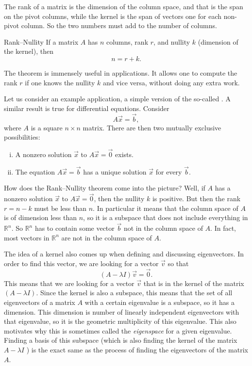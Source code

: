 The rank of a matrix is the dimension of the column space, and that is
the span on the pivot columns, while the kernel is the span of vectors
one for each non-pivot column.  So the two numbers must add to the number of
columns.

\begin{theorem1}{Rank--Nullity}
If a matrix $A$ has $n$ columns, rank $r$, and nullity $k$ (dimension of the
kernel), then
\begin{equation*}
n = r+k .
\end{equation*}
\end{theorem1}

The theorem is immensely useful in applications.  It allows one to compute
the rank $r$ if one knows the nullity $k$ and vice versa, without doing any
extra work.

Let us consider an example application, a simple version of the so-called
\emph{}.  A similar result is true for
differential equations.  Consider
\begin{equation*}
A \vec{x} = \vec{b} ,
\end{equation*}
where $A$ is a square $n \times n$ matrix.
There are then two mutually exclusive possibilities:
\begin{enumerate}[(i)]
\item
A nonzero solution $\vec{x}$ to $A \vec{x} = \vec{0}$ exists.
\item
The equation $A \vec{x} = \vec{b}$ has a unique solution $\vec{x}$ for every
$\vec{b}$.
\end{enumerate}
How does the Rank--Nullity theorem come into the picture?  Well, if $A$ has
a nonzero solution $\vec{x}$ to $A \vec{x} = \vec{0}$, then the nullity $k$ is
positive.  But then the rank $r = n-k$ must be less than $n$.  In particular
it means that the column space of $A$ is of dimension less than $n$, so it is
a subspace that does not include everything in ${\mathbb{R}}^n$.
So ${\mathbb{R}}^n$ has to
contain some vector $\vec{b}$ not in the column space of $A$.  In fact, most
vectors in ${\mathbb{R}}^n$ are not in the column space of $A$.

The idea of a kernel also comes up when defining and discussing eigenvectors. In order to find this vector, we are looking for a vector $\vec{v}$ so that
\[ (A - \lambda I)\vec{v} = \vec{0}.\] This means that we are looking for a vector $\vec{v}$ that is in the kernel of the matrix $(A - \lambda I)$. Since the kernel is also a subspace, this means that the set of all eigenvectors of a matrix $A$ with a certain eigenvalue is a subspace, so it has a dimension. This dimension is number of linearly independent eigenvectors with that eigenvalue, so it is the geometric multiplicity of this eigenvalue. This also motivates why this is sometimes called the \emph{eigenspace} for a given eigenvalue. Finding a basis of this subspace (which is also finding the kernel of the matrix $A - \lambda I$ ) is the exact same as the process of finding the eigenvectors of the matrix $A$. 

